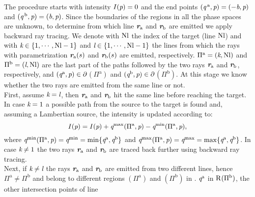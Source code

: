 The procedure starts with intensity $I(\textit{p})=0$ and the end points $(\textit{q}^{\,\textrm{a}}, \textit{p})= (-\textit{b}, \textit{p})$ and $(\textit{q}^{\,\textrm{b}}, \textit{p}) = (\textit{b}, \textit{p})$. Since the boundaries of the regions in all the phase spaces are unknown, to determine from which line $\textit{\textbf{r}}_{\textrm{a}}$ and $\textit{\textbf{r}}_{\textrm{b}}$ are emitted we apply backward ray tracing. We denote with $\textrm{Nl}$ the index of the target (line $\textrm{Nl}$) and with $\textit{k}\in\{1,\cdots, \textrm{Nl}-1\}$ and $\textit{l}\in\{1,\cdots, \textrm{Nl}-1\}$ the lines from which the rays with parametrization $\textit{\textbf{r}}_{\textrm{a}}(s)$ and $\textit{\textbf{r}}_{\textrm{b}}(s)$ are emitted, respectively. $\Pi^\textrm{a} = (\textit{k}, \textrm{Nl})$ and $\Pi^\textrm{b} = (\textit{l},\textrm{Nl})$ are the last part of the paths followed by the two rays $\textit{\textbf{r}}_{\textrm{a}}$ and $\textit{\textbf{r}}_{\textrm{b}}$, respectively, and $(\textit{q}^{\textrm{a}}, \textit{p})\in\partial$$(\Pi^{\textrm{a}})$ and $(\textit{q}^{\textrm{b}}, \textit{p})\in\partial$$(\Pi^{\textrm{b}})$. At this stage we know whether the two rays are emitted from the same line or not. \\ \indent 
First, assume $\textit{k}= \textit{l}$, then $\textit{\textbf{r}}_{\textrm{a}}$ and $\textit{\textbf{r}}_{\textrm{b}}$ hit the same line before reaching the target. 
In case $\textit{k} = 1$ a possible path from the source to the target is found and, assuming a Lambertian source, the intensity is updated according to:
\begin{equation}\label{eq:intensity_brm}
I(\textit{p}) = I(\textit{p})+\textit{q}^{\textrm{max}}(\Pi^\textrm{a}, \textit{p})-\textit{q}^{\textrm{min}}(\Pi^\textrm{a}, \textit{p}),
\end{equation}
where $\textit{q}^{\textrm{min}}(\Pi^\textrm{a}, \textit{p}) = \textit{q}^{\textrm{min}} = \min\{\textit{q}^{\textrm{a}}, \textit{q}^{\textrm{b}}\}$ and $\textit{q}^{\textrm{max}}(\Pi^\textrm{a}, \textit{p}) = \textit{q}^{\textrm{max}} = \max\{\textit{q}^{\textrm{a}}, \textit{q}^{\textrm{b}}\}$. In case $\textit{k}\neq 1$ the two rays $\textit{\textbf{r}}_{\textrm{a}}$ and $\textit{\textbf{r}}_{\textrm{b}}$ are traced back further using backward ray tracing.
\\ \indent Next, if $\textit{k}\neq \textit{l}$ the rays $\textit{\textbf{r}}_\textrm{a}$ and $\textit{\textbf{r}}_\textrm{b}$ are emitted from two different lines, hence $\Pi^{\textrm{a}}\neq \Pi^{\textrm{b}}$ and belong to different regions $(\Pi^{\textrm{a}})$ and $(\Pi^{\textrm{b}})$ in . $\textit{q}^{\textrm{a}}$ in $\mbox{$\textup{R}_{\textit{}}$}(\Pi^{\textrm{b}})$, the other intersection points of line 
